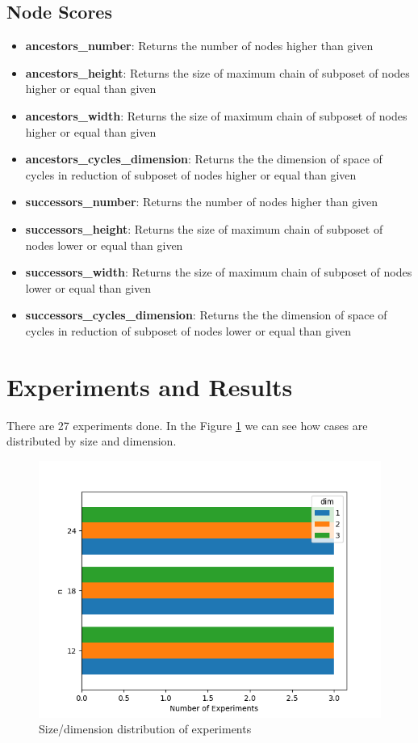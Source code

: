 \documentclass{article}
\begin{document}
\subsection{Node Scores}
\begin{itemize}
\item \textbf{ancestors\_number}: Returns the number of nodes higher than given
\item \textbf{ancestors\_height}: Returns the size of maximum chain of subposet of nodes higher or equal than given
\item \textbf{ancestors\_width}: Returns the size of maximum chain of subposet of nodes higher or equal than given
\item \textbf{ancestors\_cycles\_dimension}: Returns the the dimension of space of cycles in reduction of subposet of nodes higher or equal than given
\item \textbf{successors\_number}: Returns the number of nodes higher than given
\item \textbf{successors\_height}: Returns the size of maximum chain of subposet of nodes lower or equal than given
\item \textbf{successors\_width}: Returns the size of maximum chain of subposet of nodes lower or equal than given
\item \textbf{successors\_cycles\_dimension}: Returns the the dimension of space of cycles in reduction of subposet of nodes lower or equal than given
\end{itemize}

\section{Experiments and Results}
\par There are 27 experiments done. In the Figure \ref{fig:cases_distribution} we can see how cases are distributed by size and dimension.
\begin{figure}[ht]
  \centering
  \includegraphics[width=\textwidth]{pics/scores - cases.png}
  \caption{Size/dimension distribution of experiments}
  \label{fig:cases_distribution}
\end{figure}
\end{document}
